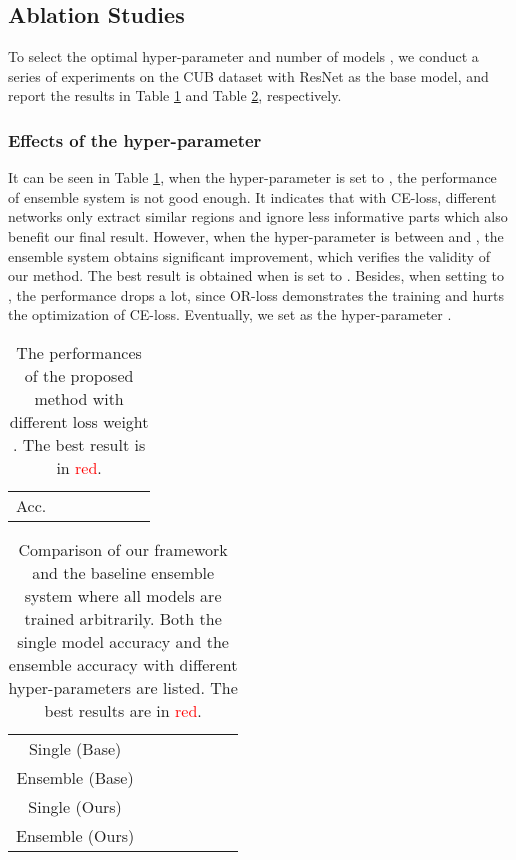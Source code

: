 \documentclass{article}
\begin{document}
\subsection{Ablation Studies}

To select the optimal hyper-parameter  and number of models , we conduct a series of experiments on the CUB dataset with ResNet as the base model, and report the results in Table \ref{tab:omega} and Table \ref{tab:n}, respectively.

\subsubsection{Effects of the hyper-parameter } 
It can be seen in Table \ref{tab:omega}, when the hyper-parameter  is set to , the performance of ensemble system is not good enough. It indicates that with CE-loss, different networks only extract similar regions and ignore less informative parts which also benefit our final result. However, when the hyper-parameter  is between  and , the ensemble system obtains significant improvement, which verifies the validity of our method. The best result is obtained when  is set to . Besides, when setting  to , the performance drops a lot, since OR-loss demonstrates the training and hurts the optimization of CE-loss. Eventually, we set  as the hyper-parameter .
\begin{table}[!t]
  \centering
        \caption{The performances of the proposed method with different loss weight . The best result is in \textcolor{red}{red}.}
    \vspace{+0.3cm}
    \begin{tabular}{|c|c|c|c|c|c|c|}
    \hline
    &  &  &  &  &  &  \\
   \hline
   \hline
   Acc. &  &  &  & \textcolor{red}{} &  &  \\
   \hline
    \end{tabular}\label{tab:omega}\end{table}

\begin{table}[ht]
  \centering
   \caption{
   Comparison of our framework and the baseline ensemble system where all models are trained arbitrarily. Both the single model accuracy and the ensemble accuracy with different hyper-parameters  are listed. The best results are in \textcolor{red}{red}.
   }
  \vspace{+0.3cm}
  \begin{adjustbox}{width=0.9\linewidth,center}
    \begin{tabular}{|c|c|c|c|c|c|c|}
    \hline
 &  &  &  &  &  &  \\
 \hline 
\hline
Single (Base) & \textcolor{red}{} &  &  &  &  &  \\
\hline
Ensemble (Base) &  &  &  &  & \textcolor{red}{} &  \\
 \hline
  \hline
Single (Ours) & \textcolor{red}{} &  &  &  &  &  \\
 \hline
Ensemble (Ours) &  &  &  &  & \textcolor{red}{} & \textcolor{red}{}  \\
\hline
    \end{tabular}\end{adjustbox}
  \label{tab:n}\end{table}
\end{document}
